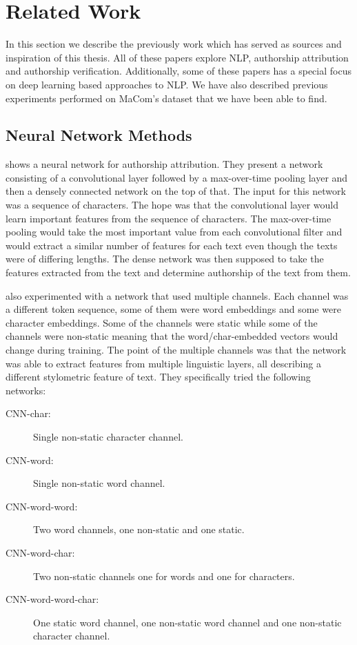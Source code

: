 \section{Related Work} \label{sec:related_work}

In this section we describe the previously work which has served as sources and
inspiration of this thesis. All of these papers explore \gls{NLP}, authorship
attribution and authorship verification. Additionally, some of these papers has
a special focus on deep learning based approaches to \gls{NLP}. We have also
described previous experiments performed on MaCom's dataset that we have been
able to find.


\subsection{Neural Network Methods}

\citet{DBLP:journals/corr/RuderGB16c} shows a neural network for authorship
attribution. They present a network consisting of a convolutional layer followed
by a max-over-time pooling layer and then a densely connected network on the top
of that. The input for this network was a sequence of characters. The hope was
that the convolutional layer would learn important features from the sequence
of characters. The max-over-time pooling would take the most important value
from each convolutional filter and would extract a similar number of features
for each text even though the texts were of differing lengths. The dense network
was then supposed to take the features extracted from the text and determine
authorship of the text from them.

\citet{DBLP:journals/corr/RuderGB16c} also experimented with a network that
used multiple channels. Each channel was a different token sequence, some of
them were word embeddings and some were character embeddings. Some of the
channels were static while some of the channels were non-static meaning that
the word/char-embedded vectors would change during training. The point of
the multiple channels was that the network was able to extract features from
multiple linguistic layers, all describing a different stylometric feature of
text. They specifically tried the following networks:

\begin{description}
    \item[CNN-char:] Single non-static character channel.
    \item[CNN-word:] Single non-static word channel.
    \item[CNN-word-word:] Two word channels, one non-static and one static.
    \item[CNN-word-char:] Two non-static channels one for words and one for
        characters.
    \item[CNN-word-word-char:] One static word channel, one non-static word
        channel and one non-static character channel.
\end{description}


